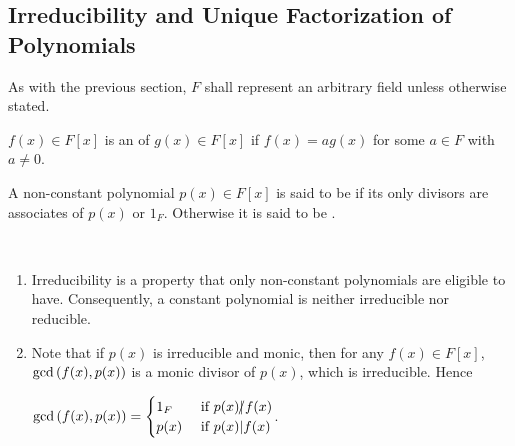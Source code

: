 \documentclass[11pt,fleqn,dvipsnames,usenames]{article}
\newcommand{\p}{\noindent}
\begin{document}
\subsection{Irreducibility and Unique Factorization of Polynomials}

\p As with the previous section, $F$ shall represent an arbitrary field unless otherwise stated.

\begin{definition}
$f(x)\in F[x]$ is an  of $g(x)\in F[x]$ if $f(x) = ag(x)$ for some $a\in F$ with $a\neq 0$.
\end{definition}
%
\begin{definition}
A non-constant polynomial $p(x)\in F[x]$ is said to be  if its only divisors are associates of $p(x)$ or $1_{F}$.  Otherwise it is said to be .
\end{definition}
%
\begin{remarks}\label{oneorppoly}~
\begin{enumerate}[(1)]
\item Irreducibility is a property that only non-constant polynomials are eligible to have.  Consequently, a constant polynomial is neither irreducible nor reducible.
\item Note that if $p(x)$ is irreducible and monic, then for any $f(x)\in F[x]$, $\text{gcd}\left(f(x),p(x)\right)$ is a monic divisor of $p(x)$, which is irreducible.  Hence
\begin{center}
$\text{gcd}\left(f(x),p(x)\right) = \begin{cases}1_{F} & \text{ if }p(x)|\kern-0.9ex{/} f(x)\\p(x) & \text{ if }p(x)|f(x)\end{cases}$.
\end{center}
\end{enumerate}
\end{remarks}
\vsp
\end{document}
